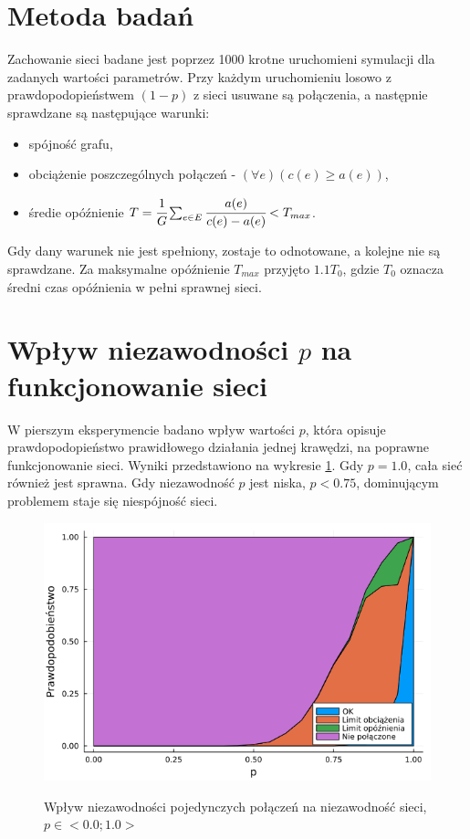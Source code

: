 \documentclass{article}
\begin{document}
    \section{Metoda badań}
    Zachowanie sieci badane jest poprzez 1000 krotne uruchomieni symulacji dla zadanych wartości parametrów. Przy każdym uruchomieniu losowo z prawdopodopieństwem $(1-p)$ z sieci usuwane są połączenia, a następnie sprawdzane są następujące warunki:
    \begin{itemize}
        \item spójność grafu,
        \item obciążenie poszczególnych połączeń - $\left(\forall e\right)\left(c(e) \geq a(e)\right)$,
        \item średie opóźnienie $T = \cfrac{1}{G} \sum_{e \in E} \cfrac{a(e)}{c(e) - a(e)} < T_{max}$.
    \end{itemize}

    Gdy dany warunek nie jest spełniony, zostaje to odnotowane, a kolejne nie są sprawdzane. Za maksymalne opóźnienie $T_{max}$ przyjęto $1.1 T_0$, gdzie $T_0$ oznacza średni czas opóźnienia w pełni sprawnej sieci.


    \section{Wpływ niezawodności $p$ na funkcjonowanie sieci}
    W pierszym eksperymencie badano wpływ wartości $p$, która opisuje prawdopodopieństwo prawidłowego działania jednej krawędzi, na poprawne funkcjonowanie sieci. Wyniki przedstawiono na wykresie \ref{fig:exp_p2}. Gdy $p=1.0$, cała sieć również jest sprawna. Gdy niezawodność $p$ jest niska, $p<0.75$, dominującym problemem staje się niespójność sieci. 
    \begin{figure}[h]
        \centering
        \includegraphics[width=12cm]{../experiment_p2.png}
        \label{fig:exp_p2}
        \caption{Wpływ niezawodności pojedynczych połączeń na niezawodność sieci, $p\in<0.0;1.0>$}
    \end{figure}
\end{document}
